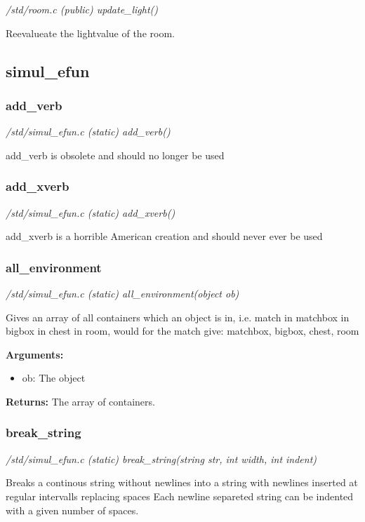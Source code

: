 {\em /std/room.c (public) update\_light()}

Reevalueate the lightvalue of the room.


\subsection{simul\_efun}
\subsubsection{add\_verb}

{\em /std/simul\_efun.c (static) add\_verb()}

add\_verb is obsolete and should no longer be used


\subsubsection{add\_xverb}

{\em /std/simul\_efun.c (static) add\_xverb()}

add\_xverb is a horrible American creation and should never ever be used


\subsubsection{all\_environment}

{\em /std/simul\_efun.c (static) all\_environment(object ob)}

Gives an array of all containers which an object is in, i.e.
match in matchbox in bigbox in chest in room, would for the
match give: matchbox, bigbox, chest, room

{\bf Arguments:}
\begin{itemize}
\item      ob: The object
\end{itemize}

{\bf Returns:}        The array of containers.


\subsubsection{break\_string}

{\em /std/simul\_efun.c (static) break\_string(string str, int width, int indent)}

Breaks a continous string without newlines into a string
with newlines inserted at regular intervalls replacing spaces
Each newline separeted string can be indented with a given
number of spaces.

